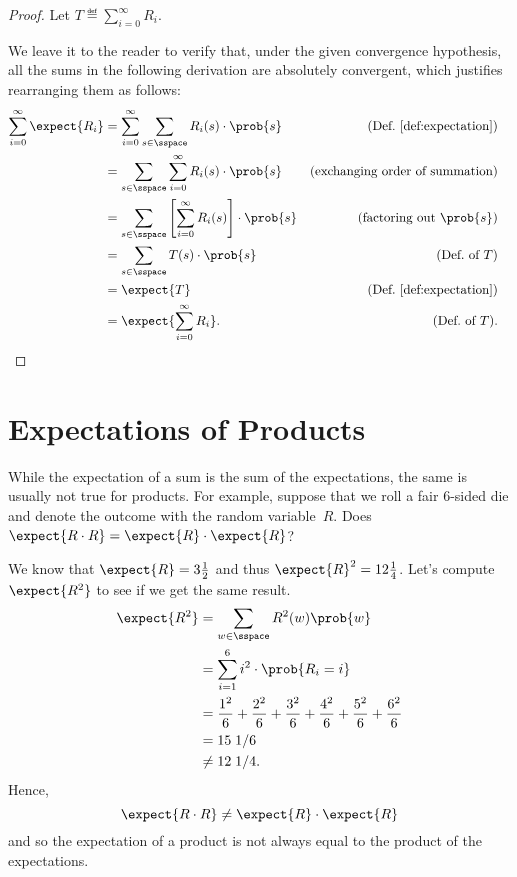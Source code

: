 \begin{proof}
Let $T \eqdef \sum_{i = 0}^\infty R_i$.

We leave it to the reader to verify that, under the given convergence
hypothesis, all the sums in the following derivation are absolutely
convergent, which justifies rearranging them as follows:
\begin{align*}
\sum_{i=0}^\infty \expect{R_i}
    &= \sum_{i=0}^\infty \sum_{s \in \sspace} R_i(s) \cdot \prob{s}
            & \text{(Def.~\ref{def:expectation})}\\
    &= \sum_{s \in \sspace} \sum_{i=0}^\infty R_i(s) \cdot \prob{s}
           & \text{(exchanging order of summation)}\\
    &= \sum_{s \in \sspace} \left[ \sum_{i=0}^\infty R_i(s) \right] \cdot \prob{s}
                & \text{(factoring out $\prob{s}$)}\\
    &= \sum_{s \in \sspace} T(s) \cdot \prob{s} & \text{(Def.\ of $T$)}\\
    &= \expect{T} & \text{(Def.~\ref{def:expectation})}\\
    &= \expect{\sum_{i = 0}^\infty R_i}. &  \text{(Def.\ of $T$)}. &\qedhere
\end{align*}
\end{proof}

\section{Expectations of Products}

While the expectation of a sum is the sum of the expectations, the same is
usually not true for products.  For example, suppose that we roll a
fair 6-sided die and denote the outcome with the random variable~$R$.
Does $\expect{R \cdot R} = \expect{R} \cdot \expect{R}$?

We know that $\expect{R} = 3\frac{1}{2}$ and thus $\expect{R}^2 =
12\frac{1}{4}$.  Let's compute~$\expect{R^2}$ to see if we get the same
result.
\begin{align*}
\expect{R^2}
    & = \sum_{w \in \sspace} R^2(w) \prob{w} \\
    & = \sum_{i=1}^6 i^2 \cdot \prob{R_i = i} \\
    & = \frac{1^2}{6} + \frac{2^2}{6} + \frac{3^2}{6} +
            \frac{4^2}{6} + \frac{5^2}{6} + \frac{6^2}{6} \\
    & =   15\; 1/6\\
    & \neq  12 \; 1/4.
\end{align*}
Hence,
\begin{equation*}
    \expect{R \cdot R} \ne \expect{R} \cdot \expect{R}
\end{equation*}
and so the expectation of a product is not always equal to the product
of the expectations.

